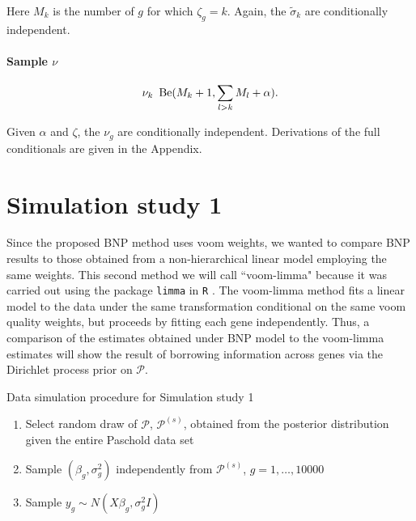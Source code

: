     Here $M_k$ is the number of $g$ for which $\zeta_g = k$. Again, the $\tilde{\sigma}_k$ are conditionally independent.

\paragraph{Sample $\nu$}
\begin{equation*}
\nu_k ~ \operatorname{Be}(M_k + 1, \sum_{l>k}M_l + \alpha).
\end{equation*}

Given $\alpha$ and $\zeta$, the $\nu_g$ are conditionally independent. Derivations of the full conditionals are given in the Appendix.

\section{Simulation study 1}
\label{sec:ss1}
Since the proposed BNP method uses voom weights, we wanted to compare BNP results to those obtained from a non-hierarchical linear model employing the same weights. This second method we will call ``voom-limma" because it was carried out using the package \texttt{limma} in \texttt{R} \citep{smyth2005limma}. The voom-limma method fits a linear model to the data under the same transformation conditional on the same voom quality weights, but proceeds by fitting each gene independently. Thus, a comparison of the estimates obtained under BNP model to the voom-limma estimates will show the result of borrowing information across genes via the Dirichlet process prior on $\mathcal{P}$.

\begin{table}
\caption{Data simulation procedure for Simulation study 1}
\begin{enumerate}
\item Select random draw of $\mathcal{P}$, $\mathcal{P}^{(s)}$, obtained from the posterior distribution given the entire Paschold data set
\item Sample $(\beta_g,\sigma^2_g)$ independently from $\mathcal{P}^{(s)}$, $g=1,\ldots,10000$
\item Sample $y_{g} \sim N(X\beta_g,\sigma^2_g I)$
\end{enumerate}
\end{table}

